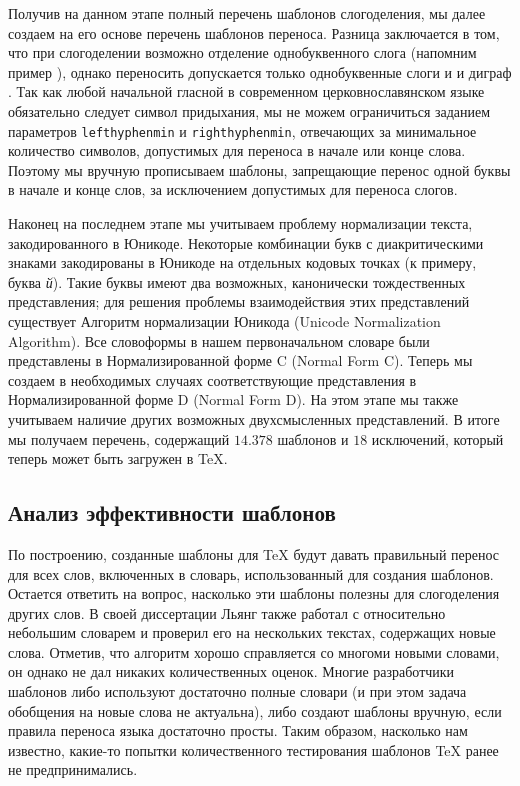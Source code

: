 \documentclass[12pt,a4paper,oneside]{extarticle}
\begin{document}
Получив на данном этапе полный перечень шаблонов слогоделения, мы далее создаем на его основе перечень шаблонов переноса. Разница заключается в том, что при слогоделении возможно отделение однобуквенного слога (напомним пример ), однако переносить допускается только однобуквенные слоги  и  и диграф . Так как любой начальной гласной в современном церковнославянском языке обязательно следует символ придыхания, мы не можем ограничиться заданием параметров \verb+lefthyphenmin+ и \verb+righthyphenmin+, отвечающих за минимальное количество символов, допустимых для переноса в начале или конце слова. Поэтому мы вручную прописываем шаблоны, запрещающие перенос одной буквы в начале и конце слов, за исключением допустимых для переноса слогов.

Наконец на последнем этапе мы учитываем проблему нормализации текста, закодированного в Юникоде. Некоторые комбинации букв с диакритическими знаками закодированы в Юникоде на отдельных кодовых точках (к примеру, буква \emph{й}). Такие буквы имеют два возможных, канонически тождественных представления; для решения проблемы взаимодействия этих представлений существует Алгоритм нормализации Юникода (\textenglish{Unicode Normalization Algorithm})\autocite[Подробности см. ][]{tr15}. Все словоформы в нашем первоначальном словаре были представлены в Нормализированной форме C (\textenglish{Normal Form C}). Теперь мы создаем в необходимых случаях соответствующие представления в Нормализированной форме D (\textenglish{Normal Form D}). На этом этапе мы также учитываем наличие других возможных двухсмысленных представлений\autocite[Специфику нормализации церковнославянского текста см. в работе ][]{utn41}. В итоге мы получаем перечень, содержащий $14.378$ шаблонов и $18$ исключений, который теперь может быть загружен в \TeX{}.

\subsection{Анализ эффективности шаблонов}

По построению, созданные шаблоны для \TeX{} будут давать правильный перенос для всех слов, включенных в словарь, использованный для создания шаблонов. Остается ответить на вопрос, насколько эти шаблоны полезны для слогоделения других слов. В своей диссертации Льянг также работал с относительно небольшим словарем и проверил его на нескольких текстах, содержащих новые слова. Отметив, что алгоритм хорошо справляется со многоми новыми словами, он однако не дал никаких количественных оценок. Многие разработчики шаблонов либо используют достаточно полные словари (и при этом задача обобщения на новые слова не актуальна), либо создают шаблоны вручную, если правила переноса языка достаточно просты. Таким образом, насколько нам известно, какие-то попытки количественного тестирования шаблонов \TeX{} ранее не предпринимались.
\end{document}
